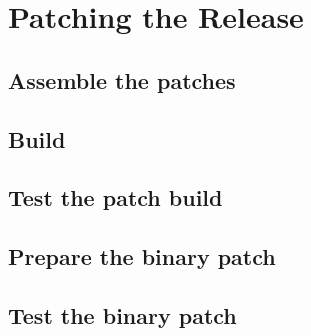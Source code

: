 \chapter{Patching the Release}
\section{Assemble the patches}
\section{Build}
\section{Test the patch build}
\section{Prepare the binary patch}
\section{Test the binary patch}
